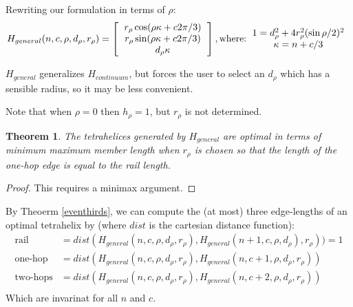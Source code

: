 \documentclass[11pt]{article}
\newtheorem{theorem}{Theorem}
\begin{document}
Rewriting our formulation in terms of $\rho$:
\[
H_{general}(n,c,\rho,d_{\rho},r_{\rho}) =
\left [
  \begin{tabular}{c}
   $ r_{\rho} \cos(\rho \kappa + c 2 \pi /3) $\\
   $ r_{\rho}  \sin(\rho \kappa + c 2 \pi /3) $\\
   $ d_{\rho} \kappa $
  \end{tabular}
  \right ],
\text{where:}
\begin{tabular}{c}
  $   1 = d_{\rho}^2 + 4 r_{\rho}^2 (\sin{ \rho / 2})^2 $ \\
    $\kappa = n + c/3$ \\
  \end{tabular}      
\]

$H_{general}$ generalizes $H_{continuum}$, but forces the user to select an $d_{\rho}$
which has a sensible radius, so it may be less convenient.

Note that when $\rho = 0$ then $h_{\rho} = 1$, but $r_{\rho}$ is not determined.

\begin{theorem}
  \label{generalformulaoptimal}
  The tetrahelices generated by $H_{general}$ are optimal in terms of minimum maximum member length when $r_{\rho}$ is chosen so that
  the length of the one-hop edge is equal to the rail length.
\end{theorem}

\begin{proof}
  This requires a minimax argument.
\end{proof}

By Theoerm \ref{eventhirds}, we can compute the (at most) three edge-lengths of an optimal
tetrahelix by (where $dist$ is the cartesian distance function):
\begin{align*}
  \text{rail} &= dist(H_{general}(n,c,\rho,d_{\rho},r_{\rho}),H_{general}(n+1,c,\rho,d_{\rho}),r_{\rho})) = 1 \\
  \text{one-hop} &= dist(H_{general}(n,c,\rho,d_{\rho},r_{\rho}),H_{general}(n,c+1,\rho,d_{\rho},r_{\rho}))  \\
  \text{two-hops} &= dist(H_{general}(n,c,\rho,d_{\rho},r_{\rho}),H_{general}(n,c+2,\rho,d_{\rho},r_{\rho}))  \\  
\end{align*}
Which are invarinat for all $n$ and $c$.
\end{document}
